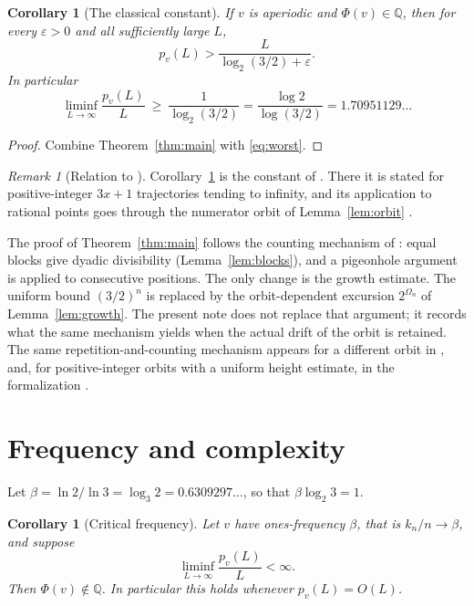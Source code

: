 \documentclass[11pt]{amsart}
\newtheorem{corollary}[theorem]{Corollary}
\theoremstyle{definition}
\theoremstyle{remark}
\newtheorem{remark}[theorem]{Remark}
\newcommand{\Q}{\mathbb{Q}}
\begin{document}
\begin{corollary}[The classical constant]\label{cor:classical}
If $v$ is aperiodic and $\Phi(v)\in\Q$, then for every $\varepsilon>0$ and all sufficiently large $L$,
\[
p_v(L)>\frac{L}{\log_2(3/2)+\varepsilon}.
\]
In particular
\[
\liminf_{L\to\infty}\frac{p_v(L)}{L}\ \ge\ \frac1{\log_2(3/2)}=\frac{\log 2}{\log(3/2)}=1.70951129\ldots
\]
\end{corollary}

\begin{proof}
Combine Theorem~\ref{thm:main} with \eqref{eq:worst}.
\end{proof}

\begin{remark}[Relation to \cite{Dub09}]
Corollary~\ref{cor:classical} is the constant of \cite[Thm.~5]{Dub09}. There it is stated for positive-integer $3x+1$ trajectories tending to infinity, and its application to rational points goes through the numerator orbit of Lemma~\ref{lem:orbit} \cite[Cor.~9.3]{DJ26}.

The proof of Theorem~\ref{thm:main} follows the counting mechanism of \cite{Dub09}: equal blocks give dyadic divisibility (Lemma~\ref{lem:blocks}), and a pigeonhole argument is applied to consecutive positions. The only change is the growth estimate. The uniform bound $(3/2)^n$ is replaced by the orbit-dependent excursion $2^{\Omega_n}$ of Lemma~\ref{lem:growth}. The present note does not replace that argument; it records what the same mechanism yields when the actual drift of the orbit is retained. The same repetition-and-counting mechanism appears for a different orbit in \cite[Thm.~4.2]{Ste26}, and, for positive-integer orbits with a uniform height estimate, in the formalization \cite{Sha26}.
\end{remark}

\section{Frequency and complexity}\label{sec:freq}

Let $\beta=\ln2/\ln3=\log_3 2=0.6309297\ldots$, so that $\beta\log_2 3=1$.

\begin{corollary}[Critical frequency]\label{cor:critical}
Let $v$ have ones-frequency $\beta$, that is $k_n/n\to\beta$, and suppose
\[
\liminf_{L\to\infty}\frac{p_v(L)}{L}<\infty .
\]
Then $\Phi(v)\notin\Q$. In particular this holds whenever $p_v(L)=O(L)$.
\end{corollary}
\end{document}
